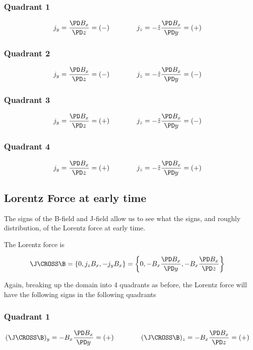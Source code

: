 \documentclass[11pt]{article}
\begin{document}
\subsubsection{Quadrant 1}
\begin{equation}
	j_y	= \frac{\PD B_x}{\PD z} = (-)
	\qquad \qquad
	j_z = - \hat{z} \frac{\PD B_x}{\PD y} = (+)
\end{equation}

\subsubsection{Quadrant 2}
\begin{equation}
	j_y	= \frac{\PD B_x}{\PD z} = (-)
	\qquad \qquad
	j_z = - \hat{z} \frac{\PD B_x}{\PD y} = (-)
\end{equation}
\subsubsection{Quadrant 3}
\begin{equation}
	j_y	= \frac{\PD B_x}{\PD z} = (+)
	\qquad \qquad
	j_z = - \hat{z} \frac{\PD B_x}{\PD y} = (-)
\end{equation}
\subsubsection{Quadrant 4}
\begin{equation}
	j_y	= \frac{\PD B_x}{\PD z} = (+)
	\qquad \qquad
	j_z = - \hat{z} \frac{\PD B_x}{\PD y} = (+)
\end{equation}

\subsection{Lorentz Force at early time}
The signs of the B-field and J-field allow us to see what the signs, and roughly distribution, of the Lorentz force at early time.

The Lorentz force is

\begin{equation}
	\J \CROSS \B
	=
	\{
	0 ,
	j_z B_x ,
	-j_y B_x
	\}
	=
	\left\{
	0 ,
	- B_x \frac{\PD B_x}{\PD y} ,
	- B_x \frac{\PD B_x}{\PD z}
	\right\}
\end{equation}

Again, breaking up the domain into 4 quadrants as before, the Lorentz force will have the following signs in the following quadrants
\subsubsection{Quadrant 1}
\begin{equation}
	(\J \CROSS \B)_y = - B_x \frac{\PD B_x}{\PD y} = (+)
	\qquad \qquad
	(\J \CROSS \B)_z = - B_x \frac{\PD B_x}{\PD z} = (+)
\end{equation}
\end{document}

